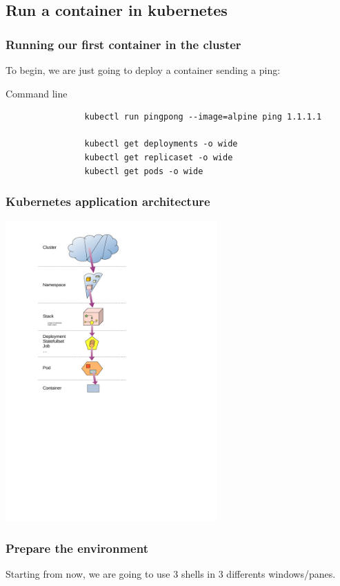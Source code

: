 \subsection{Run a container in kubernetes}	
		
	\begin{frame}[fragile]
		\frametitle{Running our first container in the cluster}
	
		To begin, we are just going to deploy a container sending a ping:
		\begin{block}{Command line}
			\begin{verbatim}
				kubectl run pingpong --image=alpine ping 1.1.1.1
				
				kubectl get deployments -o wide
				kubectl get replicaset -o wide
				kubectl get pods -o wide
			\end{verbatim}
		\end{block}
	\end{frame}
	
	\begin{frame}
		\frametitle{Kubernetes application architecture}
		
		\begin{center}
		\includegraphics[height=11.5cm]{../../../resources/color/fromCluster2container.pdf}
		\end{center}
		
	\end{frame}		

	\begin{frame}
		\frametitle{Prepare the environment}
		
		Starting from now, we are going to use 3 shells in 3 differents windows/panes.
		
	\end{frame}		

